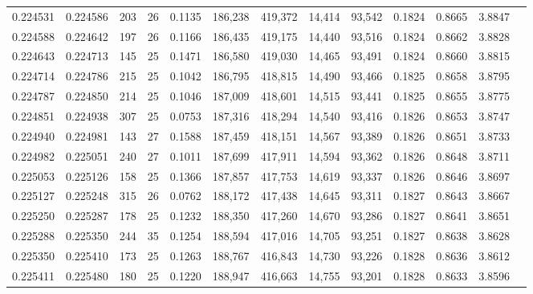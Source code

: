 \begin{tabular}{rrrrrrrrrrrrr}
0.224531 & 0.224586 &   203 &  26 &                                     0.1135 & 186,238 & 419,372 &  14,414 &  93,542 & 0.1824 & 0.8665 & 3.8847 \\
0.224588 & 0.224642 &   197 &  26 &                                     0.1166 & 186,435 & 419,175 &  14,440 &  93,516 & 0.1824 & 0.8662 & 3.8828 \\
0.224643 & 0.224713 &   145 &  25 &                                     0.1471 & 186,580 & 419,030 &  14,465 &  93,491 & 0.1824 & 0.8660 & 3.8815 \\
0.224714 & 0.224786 &   215 &  25 &                                     0.1042 & 186,795 & 418,815 &  14,490 &  93,466 & 0.1825 & 0.8658 & 3.8795 \\
0.224787 & 0.224850 &   214 &  25 &                                     0.1046 & 187,009 & 418,601 &  14,515 &  93,441 & 0.1825 & 0.8655 & 3.8775 \\
0.224851 & 0.224938 &   307 &  25 &                                     0.0753 & 187,316 & 418,294 &  14,540 &  93,416 & 0.1826 & 0.8653 & 3.8747 \\
0.224940 & 0.224981 &   143 &  27 &                                     0.1588 & 187,459 & 418,151 &  14,567 &  93,389 & 0.1826 & 0.8651 & 3.8733 \\
0.224982 & 0.225051 &   240 &  27 &                                     0.1011 & 187,699 & 417,911 &  14,594 &  93,362 & 0.1826 & 0.8648 & 3.8711 \\
0.225053 & 0.225126 &   158 &  25 &                                     0.1366 & 187,857 & 417,753 &  14,619 &  93,337 & 0.1826 & 0.8646 & 3.8697 \\
0.225127 & 0.225248 &   315 &  26 &                                     0.0762 & 188,172 & 417,438 &  14,645 &  93,311 & 0.1827 & 0.8643 & 3.8667 \\
0.225250 & 0.225287 &   178 &  25 &                                     0.1232 & 188,350 & 417,260 &  14,670 &  93,286 & 0.1827 & 0.8641 & 3.8651 \\
0.225288 & 0.225350 &   244 &  35 &                                     0.1254 & 188,594 & 417,016 &  14,705 &  93,251 & 0.1827 & 0.8638 & 3.8628 \\
0.225350 & 0.225410 &   173 &  25 &                                     0.1263 & 188,767 & 416,843 &  14,730 &  93,226 & 0.1828 & 0.8636 & 3.8612 \\
0.225411 & 0.225480 &   180 &  25 &                                     0.1220 & 188,947 & 416,663 &  14,755 &  93,201 & 0.1828 & 0.8633 & 3.8596 \\

\end{tabular}
